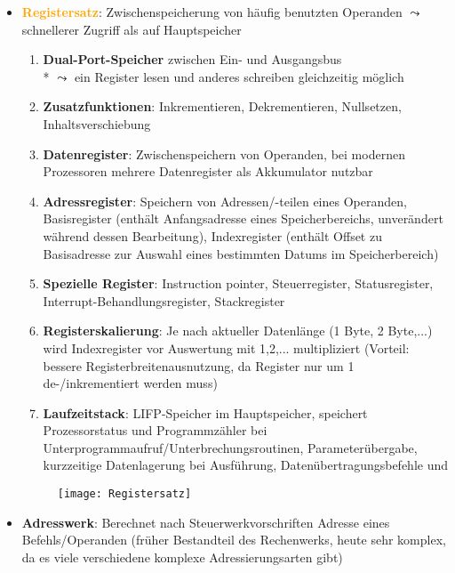 \begin{itemize}
	\item \textbf{\textcolor{orange}{Registersatz}}: Zwischenspeicherung von häufig benutzten Operanden $\leadsto$ schnellerer Zugriff als auf Hauptspeicher
	\begin{enumerate}
		\item \textbf{Dual-Port-Speicher} zwischen Ein- und Ausgangsbus \\* $\leadsto$ ein Register lesen und anderes schreiben gleichzeitig möglich
		\item \textbf{Zusatzfunktionen}: Inkrementieren, Dekrementieren, Nullsetzen, Inhaltsverschiebung
		\item \textbf{Datenregister}: Zwischenspeichern von Operanden, bei modernen Prozessoren mehrere Datenregister als Akkumulator nutzbar
		\item \textbf{Adressregister}: Speichern von Adressen/-teilen eines Operanden, Basisregister (enthält Anfangsadresse eines Speicherbereichs, unverändert während dessen Bearbeitung), Indexregister (enthält Offset zu Basisadresse zur Auswahl eines bestimmten Datums im Speicherbereich)
		\item \textbf{Spezielle Register}: Instruction pointer, Steuerregister, Statusregister, Interrupt-Behandlungsregister, Stackregister
		\item \textbf{Registerskalierung}: Je nach aktueller Datenlänge (1 Byte, 2 Byte,...) wird Indexregister vor Auswertung mit 1,2,... multipliziert (Vorteil: bessere Registerbreitenausnutzung, da Register nur um 1 de-/inkrementiert werden muss)
		\item \textbf{Laufzeitstack}: LIFP-Speicher im Hauptspeicher, speichert Prozessorstatus und Programmzähler bei Unterprogrammaufruf/Unterbrechungsroutinen, Parameterübergabe, kurzzeitige Datenlagerung bei Ausführung, Datenübertragungsbefehle  und 
	\end{enumerate}
	\begin{figure}[ht]
	  \centering
	  \texttt{[image: Registersatz]}
	  \label{Registersatz}
	\end{figure}

	\item \textbf{\textcolor{ProcessBlue}{Adresswerk}}: Berechnet nach Steuerwerkvorschriften Adresse eines Befehls/Operanden (früher Bestandteil des Rechenwerks, heute sehr komplex, da es viele verschiedene komplexe Adressierungsarten gibt)


\end{itemize}
